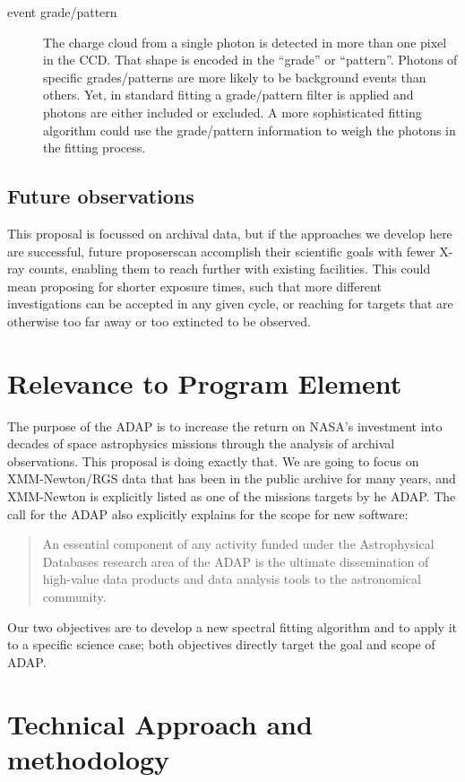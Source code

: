 \documentclass[fleqn,12pt,onecolumn]{SelfArx} %
\begin{document}
\begin{description}
    \item[event grade/pattern] The charge cloud from a single photon is detected in more than one pixel in the CCD. That shape is encoded in the ``grade'' or ``pattern''. Photons of specific grades/patterns are more likely to be background events than others. Yet, in standard fitting a grade/pattern filter is applied and photons are either included or excluded. A more sophisticated fitting algorithm could use the grade/pattern information to weigh the photons in the fitting process.
\end{description}



\subsection{Future observations}
This proposal is focussed on archival data, but if the approaches we develop here are successful, future proposerscan accomplish their scientific goals with fewer X-ray counts, enabling them to reach further with existing facilities. This could mean proposing for shorter exposure times, such that more different investigations can be accepted in any given cycle, or reaching for targets that are otherwise too far away or too extincted to be observed.

\section{Relevance to Program Element}
The purpose of the ADAP is to increase the return on NASA's investment into decades of space astrophysics missions through the analysis of archival observations. This proposal is doing exactly that. We are going to focus on XMM-Newton/RGS data that has been in the public archive for many years, and XMM-Newton is explicitly listed as one of the missions targets by he ADAP.
The call for the ADAP also explicitly explains for the scope for new software:
\begin{quote}
    An essential component of any activity funded under the Astrophysical Databases
research area of the ADAP is the ultimate dissemination of high-value data products
and data analysis tools to the astronomical community.
\end{quote}
Our two objectives are to develop a new spectral fitting algorithm and to apply it to a specific science case; both objectives directly target the goal and scope of ADAP.

\section{Technical Approach and methodology}
\end{document}
